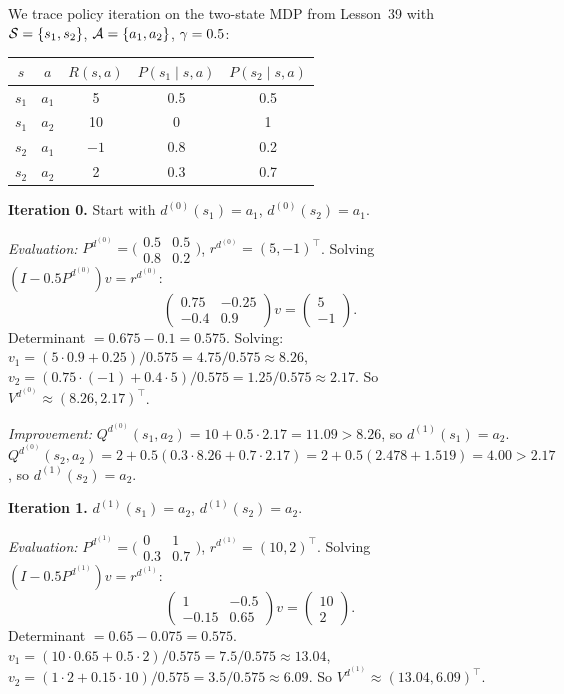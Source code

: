 \documentclass[11pt,a4paper]{article}
\begin{document}
\begin{example}
\label{ex:pi-trace}
We trace policy iteration on the two-state MDP from Lesson~39 with
$\mathcal{S} = \{s_1, s_2\}$, $\mathcal{A} = \{a_1, a_2\}$,
$\gamma = 0.5$:
\begin{center}
\begin{tabular}{ccccc}
\toprule
$s$ & $a$ & $R(s,a)$ & $P(s_1 \mid s,a)$ & $P(s_2 \mid s,a)$ \\
\midrule
$s_1$ & $a_1$ & 5 & 0.5 & 0.5 \\
$s_1$ & $a_2$ & 10 & 0 & 1 \\
$s_2$ & $a_1$ & $-1$ & 0.8 & 0.2 \\
$s_2$ & $a_2$ & 2 & 0.3 & 0.7 \\
\bottomrule
\end{tabular}
\end{center}

\textbf{Iteration 0.} Start with $d^{(0)}(s_1) = a_1$,
$d^{(0)}(s_2) = a_1$.

\emph{Evaluation:}
$P^{d^{(0)}} = \bigl(\begin{smallmatrix} 0.5 & 0.5 \\
0.8 & 0.2 \end{smallmatrix}\bigr)$,
$r^{d^{(0)}} = (5, -1)^\top$.
Solving $(I - 0.5 P^{d^{(0)}}) v = r^{d^{(0)}}$:
\[
    \begin{pmatrix} 0.75 & -0.25 \\ -0.4 & 0.9 \end{pmatrix}
    v = \begin{pmatrix} 5 \\ -1 \end{pmatrix}.
\]
Determinant $= 0.675 - 0.1 = 0.575$. Solving:
$v_1 = (5 \cdot 0.9 + 0.25)/0.575 = 4.75/0.575 \approx 8.26$,
$v_2 = (0.75 \cdot (-1) + 0.4 \cdot 5)/0.575 = 1.25/0.575
\approx 2.17$.
So $V^{d^{(0)}} \approx (8.26, 2.17)^\top$.

\emph{Improvement:}
$Q^{d^{(0)}}(s_1, a_2) = 10 + 0.5 \cdot 2.17 = 11.09 > 8.26$,
so $d^{(1)}(s_1) = a_2$.
$Q^{d^{(0)}}(s_2, a_2) = 2 + 0.5(0.3 \cdot 8.26 + 0.7 \cdot 2.17)
= 2 + 0.5(2.478 + 1.519) = 4.00 > 2.17$,
so $d^{(1)}(s_2) = a_2$.

\textbf{Iteration 1.} $d^{(1)}(s_1) = a_2$, $d^{(1)}(s_2) = a_2$.

\emph{Evaluation:}
$P^{d^{(1)}} = \bigl(\begin{smallmatrix} 0 & 1 \\
0.3 & 0.7 \end{smallmatrix}\bigr)$,
$r^{d^{(1)}} = (10, 2)^\top$.
Solving $(I - 0.5 P^{d^{(1)}}) v = r^{d^{(1)}}$:
\[
    \begin{pmatrix} 1 & -0.5 \\ -0.15 & 0.65 \end{pmatrix}
    v = \begin{pmatrix} 10 \\ 2 \end{pmatrix}.
\]
Determinant $= 0.65 - 0.075 = 0.575$.
$v_1 = (10 \cdot 0.65 + 0.5 \cdot 2)/0.575 = 7.5/0.575
\approx 13.04$,
$v_2 = (1 \cdot 2 + 0.15 \cdot 10)/0.575 = 3.5/0.575
\approx 6.09$.
So $V^{d^{(1)}} \approx (13.04, 6.09)^\top$.


\end{example}
\end{document}

